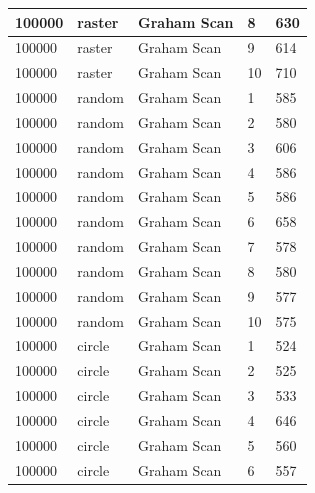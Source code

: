 \documentclass[12pt]{article}
\begin{document}
\begin{longtable}{|l|l|l|l|l|}
100000       & raster            & Graham Scan & 8          & 630                           \\ \hline
100000       & raster            & Graham Scan & 9          & 614                           \\ \hline
100000       & raster            & Graham Scan & 10         & 710                           \\ \hline
100000       & random            & Graham Scan & 1          & 585                           \\ \hline
100000       & random            & Graham Scan & 2          & 580                           \\ \hline
100000       & random            & Graham Scan & 3          & 606                           \\ \hline
100000       & random            & Graham Scan & 4          & 586                           \\ \hline
100000       & random            & Graham Scan & 5          & 586                           \\ \hline
100000       & random            & Graham Scan & 6          & 658                           \\ \hline
100000       & random            & Graham Scan & 7          & 578                           \\ \hline
100000       & random            & Graham Scan & 8          & 580                           \\ \hline
100000       & random            & Graham Scan & 9          & 577                           \\ \hline
100000       & random            & Graham Scan & 10         & 575                           \\ \hline
100000       & circle            & Graham Scan & 1          & 524                           \\ \hline
100000       & circle            & Graham Scan & 2          & 525                           \\ \hline
100000       & circle            & Graham Scan & 3          & 533                           \\ \hline
100000       & circle            & Graham Scan & 4          & 646                           \\ \hline
100000       & circle            & Graham Scan & 5          & 560                           \\ \hline
100000       & circle            & Graham Scan & 6          & 557                           \\ \hline

\end{longtable}
\end{document}
